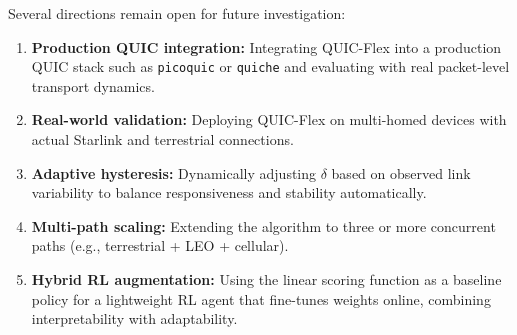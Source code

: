 \documentclass[conference,10pt]{IEEEtran}
\begin{document}
Several directions remain open for future investigation:

\begin{enumerate}
    \item \textbf{Production QUIC integration:} Integrating QUIC-Flex into a production QUIC stack such as \texttt{picoquic} or \texttt{quiche} and evaluating with real packet-level transport dynamics.
    \item \textbf{Real-world validation:} Deploying QUIC-Flex on multi-homed devices with actual Starlink and terrestrial connections.
    \item \textbf{Adaptive hysteresis:} Dynamically adjusting $\delta$ based on observed link variability to balance responsiveness and stability automatically.
    \item \textbf{Multi-path scaling:} Extending the algorithm to three or more concurrent paths (e.g., terrestrial + LEO + cellular).
    \item \textbf{Hybrid RL augmentation:} Using the linear scoring function as a baseline policy for a lightweight RL agent that fine-tunes weights online, combining interpretability with adaptability.
\end{enumerate}

\balance


\end{document}
